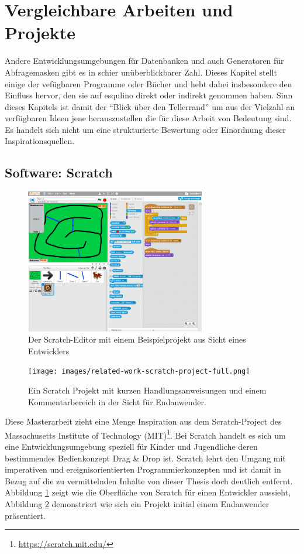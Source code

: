 \section{Vergleichbare Arbeiten und Projekte}
\label{sec:related-work}

Andere Entwicklungsumgebungen für Datenbanken und auch Generatoren für Abfragemasken gibt es in schier unüberblickbarer Zahl. Dieses Kapitel stellt einige der vefügbaren Programme oder Bücher und hebt dabei insbesondere den Einfluss hervor, den sie auf esqulino direkt oder indirekt genommen haben. Sinn dieses Kapitels ist damit der "`Blick über den Tellerrand"' um aus der Vielzahl an verfügbaren Ideen jene herauszustellen die für diese Arbeit von Bedeutung sind. Es handelt sich nicht um eine strukturierte Bewertung oder Einordnung dieser Inspirationsquellen.

\subsection{Software: Scratch}

\begin{figure}[p]
  \centering \includegraphics[width=0.7\textwidth]{images/related-work-scratch-editor-full.png}
  \caption{Der Scratch-Editor mit einem Beispielprojekt aus Sicht eines Entwicklers}
  \label{fig:scratch-editor-full}
\end{figure}

\begin{figure}[p]
  \centering \texttt{[image: images/related-work-scratch-project-full.png]}
  \caption{Ein Scratch Projekt mit kurzen Handlungsanweisungen und einem Kommentarbereich in der Sicht für Endanwender.}
  \label{fig:scratch-enduser-full}
\end{figure}


Diese Masterarbeit zieht eine Menge Inspiration aus dem Scratch-Project des Massachusetts Institute of Technology (MIT)\footnote{\url{https://scratch.mit.edu/}}. Bei Scratch handelt es sich um eine Entwicklungsumgebung speziell für Kinder und Jugendliche deren bestimmendes Bedienkonzept Drag \& Drop ist. Scratch lehrt den Umgang mit imperativen und ereignisorientierten Programmierkonzepten und ist damit in Bezug auf die zu vermittelnden Inhalte von dieser Thesis doch deutlich entfernt. Abbildung \ref{fig:scratch-editor-full} zeigt wie die Oberfläche von Scratch für einen Entwickler aussieht, Abbildung \ref{fig:scratch-enduser-full} demonstriert wie sich ein Projekt initial einem Endanwender präsentiert.


